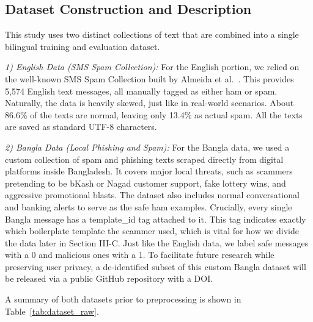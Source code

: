 \documentclass[journal]{IEEEtran}
\begin{document}
\subsection{Dataset Construction and Description}

This study uses two distinct collections of text that are combined into a single bilingual training and evaluation dataset.

\textit{1) English Data (SMS Spam Collection):} For the English portion, we relied on the well-known SMS Spam Collection built by Almeida et al.~\cite{ref1}. This provides 5,574 English text messages, all manually tagged as either ham or spam. Naturally, the data is heavily skewed, just like in real-world scenarios. About 86.6\% of the texts are normal, leaving only 13.4\% as actual spam. All the texts are saved as standard UTF-8 characters.

\textit{2) Bangla Data (Local Phishing and Spam):} For the Bangla data, we used a custom collection of spam and phishing texts scraped directly from digital platforms inside Bangladesh. It covers major local threats, such as scammers pretending to be bKash or Nagad customer support, fake lottery wins, and aggressive promotional blasts. The dataset also includes normal conversational and banking alerts to serve as the safe ham examples. Crucially, every single Bangla message has a template\_id tag attached to it. This tag indicates exactly which boilerplate template the scammer used, which is vital for how we divide the data later in Section III-C. Just like the English data, we label safe messages with a 0 and malicious ones with a 1. To facilitate future research while preserving user privacy, a de-identified subset of this custom Bangla dataset will be released via a public GitHub repository with a DOI.

A summary of both datasets prior to preprocessing is shown in Table~\ref{tab:dataset_raw}.

\begin{table}[htbp]
\caption{Dataset Composition Before Preprocessing}
\label{tab:dataset_raw}
\centering
{}
\end{table}
\end{document}
